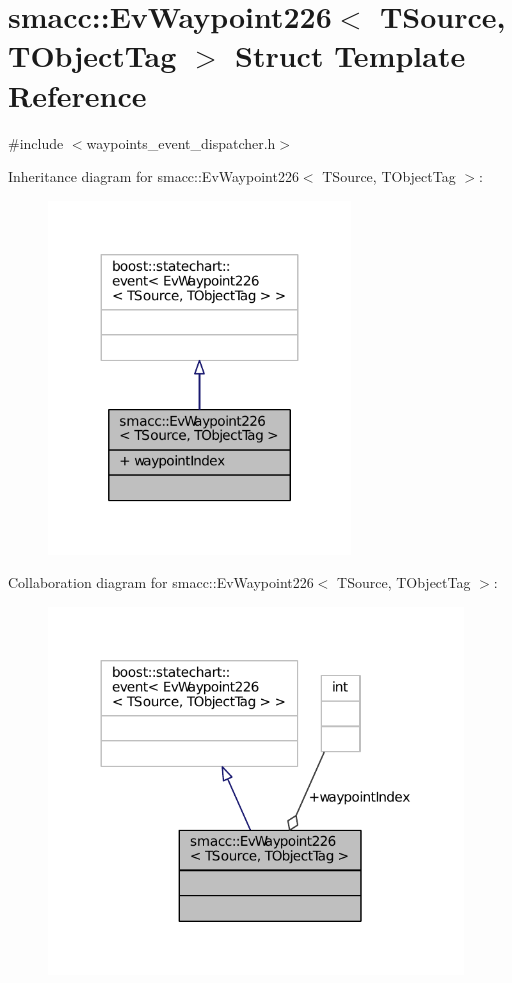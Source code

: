 \hypertarget{structsmacc_1_1EvWaypoint226}{}\section{smacc\+:\+:Ev\+Waypoint226$<$ T\+Source, T\+Object\+Tag $>$ Struct Template Reference}
\label{structsmacc_1_1EvWaypoint226}


{\ttfamily \#include $<$waypoints\+\_\+event\+\_\+dispatcher.\+h$>$}



Inheritance diagram for smacc\+:\+:Ev\+Waypoint226$<$ T\+Source, T\+Object\+Tag $>$\+:
\nopagebreak
\begin{figure}[H]
\begin{center}
\leavevmode
\includegraphics[width=227pt]{structsmacc_1_1EvWaypoint226__inherit__graph}
\end{center}
\end{figure}


Collaboration diagram for smacc\+:\+:Ev\+Waypoint226$<$ T\+Source, T\+Object\+Tag $>$\+:
\nopagebreak
\begin{figure}[H]
\begin{center}
\leavevmode
\includegraphics[width=312pt]{structsmacc_1_1EvWaypoint226__coll__graph}
\end{center}
\end{figure}
